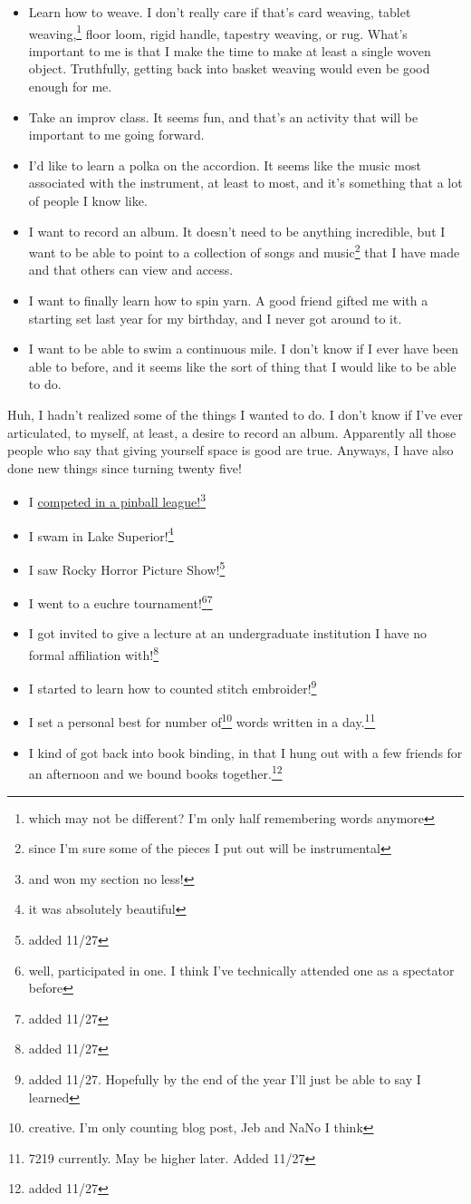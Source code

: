 \documentclass[12pt]{article}[titlepage]
\newcommand{\1}{\={a}}
\newcommand{\2}{\={e}}
\newcommand{\3}{\={\i}}
\newcommand{\4}{\=o}
\newcommand{\5}{\=u}
\newcommand{\6}{\={A}}
\renewcommand{\,}{\textsuperscript{,}}
\begin{document}
\begin{itemize}
\item Learn how to weave.
I don't really care if that's card weaving, tablet weaving,\footnote{which may not be different? I'm only half remembering words anymore} floor loom, rigid handle, tapestry weaving, or rug.
What's important to me is that I make the time to make at least a single woven object.
Truthfully, getting back into basket weaving would even be good enough for me.
\item Take an improv class.
It seems fun, and that's an activity that will be important to me going forward.
\item I'd like to learn a polka on the accordion.
It seems like the music most associated with the instrument, at least to most, and it's something that a lot of people I know like.
\item I want to record an album.
It doesn't need to be anything incredible, but I want to be able to point to a collection of songs and music\footnote{since I'm sure some of the pieces I put out will be instrumental} that I have made and that others can view and access.
\item I want to finally learn how to spin yarn.
A good friend gifted me with a starting set last year for my birthday, and I never got around to it.
\item I want to be able to swim a continuous mile.
I don't know if I ever have been able to before, and it seems like the sort of thing that I would like to be able to do.
\end{itemize}
Huh, I hadn't realized some of the things I wanted to do.
I don't know if I've ever articulated, to myself, at least, a desire to record an album.
Apparently all those people who say that giving yourself space is good are true.
Anyways, I have also done new things since turning twenty five!
\begin{itemize}
\item I \href{pinball.html}{competed in a pinball league!}\footnote{and won my section no less!}
\item I swam in Lake Superior!\footnote{it was absolutely beautiful}
\item I saw Rocky Horror Picture Show!\footnote{added 11/27}
\item I went to a euchre tournament!\footnote{well, participated in one. I think I've technically attended one as a spectator before}\footnote{added 11/27}
\item I got invited to give a lecture at an undergraduate institution I have no formal affiliation with!\footnote{added 11/27}
\item I started to learn how to counted stitch embroider!\footnote{added 11/27. Hopefully by the end of the year I'll just be able to say I learned}
\item I set a personal best for number of\footnote{creative. I'm only counting blog post, Jeb and NaNo I think} words written in a day.\footnote{7219 currently. May be higher later. Added 11/27}
\item I kind of got back into book binding, in that I hung out with a few friends for an afternoon and we bound books together.\footnote{added 11/27}
\end{itemize}
\end{document}
